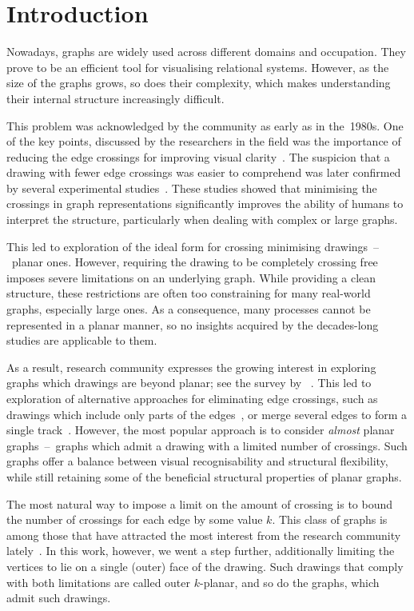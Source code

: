 \chapter{Introduction}\label{ch:introduction}

Nowadays, graphs are widely used across different domains and occupation. They prove to be an efficient tool for visualising relational systems. However, as the size of the graphs grows, so does their complexity, which makes understanding their internal structure increasingly difficult.

This problem was acknowledged by the community as early as in the~1980s. One of the key points, discussed by the researchers in the field was the importance of reducing the edge crossings for improving visual clarity~\cite{early-few-crossing}. The suspicion that a drawing with fewer edge crossings was easier to comprehend was later confirmed by several experimental studies~\cite{graph-aesthetic-survey}. These studies showed that minimising the crossings in graph representations significantly improves the ability of humans to interpret the structure, particularly when dealing with complex or large graphs.

This led to exploration of the ideal form for crossing minimising drawings~--~planar ones. However, requiring the drawing to be completely crossing free imposes severe limitations on an underlying graph. While providing a clean structure, these restrictions are often too constraining for many real-world graphs, especially large ones. As a consequence, many processes cannot be represented in a planar manner, so no insights acquired by the decades-long studies are applicable to them.

As a result, research community expresses the growing interest in exploring graphs which drawings are beyond planar; see the survey by \citeauthor{beyond-planarity-survey}~\cite{beyond-planarity-survey}. This led to exploration of alternative approaches for eliminating edge crossings, such as drawings which include only parts of the edges~\cite{break-the-edge,break-the-edge2}, or merge several edges to form a single track~\cite{confluent-drawings}. However, the most popular approach is to consider \emph{almost} planar graphs~--~graphs which admit a drawing with a limited number of crossings. Such graphs offer a balance between visual recognisability and structural flexibility, while still retaining some of the beneficial structural properties of planar graphs.

The most natural way to impose a limit on the amount of crossing is to bound the number of crossings for each edge by some value \(k\). This class of graphs is among those that have attracted the most interest from the research community lately~\cite{contest}. In this work, however, we went a step further, additionally limiting the vertices to lie on a single (outer) face of the drawing. Such drawings that comply with both limitations are called outer \(k\)-planar, and so do the graphs, which admit such drawings.


